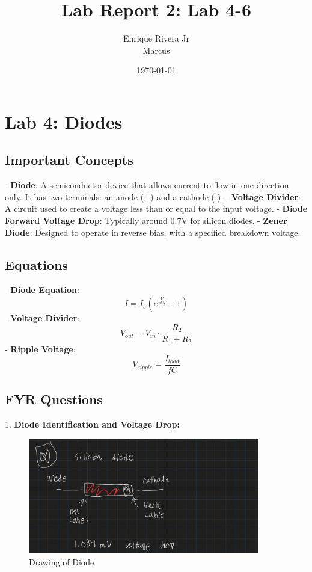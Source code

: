 \documentclass{article}
\title{Lab Report 2: Lab 4-6}
\author{Enrique Rivera Jr \\ Marcus}
\date{\today}
\begin{document}
\maketitle

\section*{Lab 4: Diodes}

\subsection*{Important Concepts}
- \textbf{Diode}: A semiconductor device that allows current to flow in one direction only. It has two terminals: an anode (+) and a cathode (-).
\newline
- \textbf{Voltage Divider}: A circuit used to create a voltage less than or equal to the input voltage.
\newline
- \textbf{Diode Forward Voltage Drop}: Typically around 0.7V for silicon diodes.
\newline
- \textbf{Zener Diode}: Designed to operate in reverse bias, with a specified breakdown voltage.

\subsection*{Equations}
- \textbf{Diode Equation}:
\[
I = I_s \left( e^{\frac{V}{nV_T}} - 1 \right)
\]
- \textbf{Voltage Divider}:
\[
V_{out} = V_{in} \cdot \frac{R_2}{R_1 + R_2}
\]
- \textbf{Ripple Voltage}:
\[
V_{ripple} = \frac{I_{load}}{fC}
\]

\subsection{FYR Questions}
1. \textbf{Diode Identification and Voltage Drop:}

\begin{figure}[H]
    \centering
    \includegraphics[width=0.9\textwidth]{./img/Lab4_1.png}
    \caption{Drawing of Diode}
    \label{fig:graph1}
\end{figure}
\end{document}
